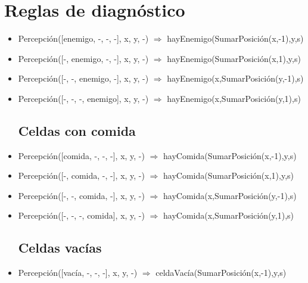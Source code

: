 \section{Reglas de diagnóstico}

\begin{itemize}

\subsection{Celdas con enemigos}
\item Percepción([enemigo, -, -, -], x, y, -) $\Rightarrow$
\newline hayEnemigo(SumarPosición(x,-1),y,s)

\item Percepción([-, enemigo, -, -], x, y, -) $\Rightarrow$
\newline hayEnemigo(SumarPosición(x,1),y,s)

\item Percepción([-, -, enemigo, -], x, y, -) $\Rightarrow$
\newline hayEnemigo(x,SumarPosición(y,-1),s)

\item Percepción([-, -, -, enemigo], x, y, -) $\Rightarrow$
\newline hayEnemigo(x,SumarPosición(y,1),s)

\subsection{Celdas con comida}
\item Percepción([comida, -, -, -], x, y, -) $\Rightarrow$
\newline hayComida(SumarPosición(x,-1),y,s)

\item Percepción([-, comida, -, -], x, y, -) $\Rightarrow$
\newline hayComida(SumarPosición(x,1),y,s)

\item Percepción([-, -, comida, -], x, y, -) $\Rightarrow$
\newline hayComida(x,SumarPosición(y,-1),s)

\item Percepción([-, -, -, comida], x, y, -) $\Rightarrow$
\newline hayComida(x,SumarPosición(y,1),s)

\subsection{Celdas vacías}
\item Percepción([vacía, -, -, -], x, y, -) $\Rightarrow$
\newline celdaVacía(SumarPosición(x,-1),y,s)


\end{itemize}
